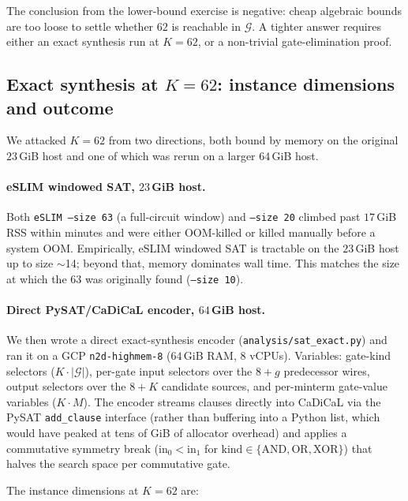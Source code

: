\documentclass[11pt]{article}
\begin{document}
The conclusion from the lower-bound exercise is negative: cheap
algebraic bounds are too loose to settle whether $62$ is reachable
in $\mathcal{G}$. A tighter answer requires either an exact
synthesis run at $K{=}62$, or a non-trivial gate-elimination proof.

\subsection{Exact synthesis at $K{=}62$: instance dimensions and outcome}
\label{sec:k62}

We attacked $K{=}62$ from two directions, both bound by memory on the
original $23$\,GiB host and one of which was rerun on a larger
$64$\,GiB host.

\paragraph{eSLIM windowed SAT, $23$\,GiB host.}
Both \texttt{eSLIM --size 63} (a full-circuit window) and
\texttt{--size 20} climbed past $17$\,GiB RSS within minutes and were
either OOM-killed or killed manually before a system OOM.
Empirically, eSLIM windowed SAT is tractable on the $23$\,GiB host up
to size $\sim$14; beyond that, memory dominates wall time. This
matches the size at which the $63$ was originally found
(\texttt{--size 10}).

\paragraph{Direct PySAT/CaDiCaL encoder, $64$\,GiB host.}
We then wrote a direct exact-synthesis encoder
(\texttt{analysis/sat\_exact.py}) and ran it on a GCP \texttt{n2d-highmem-8}
($64$\,GiB RAM, $8$ vCPUs).
Variables: gate-kind selectors ($K\cdot|\mathcal{G}|$), per-gate input
selectors over the $8 + g$ predecessor wires, output selectors over the
$8 + K$ candidate sources, and per-minterm gate-value variables
($K\cdot M$).
The encoder streams clauses directly into CaDiCaL via the PySAT
\texttt{add\_clause} interface (rather than buffering into a Python list,
which would have peaked at tens of GiB of allocator overhead) and
applies a commutative symmetry break ($\text{in}_0 < \text{in}_1$ for
$\text{kind} \in \{\text{AND}, \text{OR}, \text{XOR}\}$) that halves
the search space per commutative gate.

The instance dimensions at $K{=}62$ are:
\end{document}

